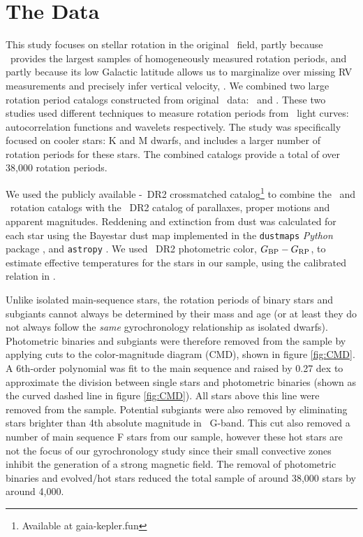 \section{The Data}
\label{sec:data}

This study focuses on stellar rotation in the original \kepler\ field, partly
because \kepler\ provides the largest samples of homogeneously measured
rotation periods, and partly because its low Galactic latitude allows us to
marginalize over missing RV measurements and precisely infer vertical
velocity, \vz.
We combined two large rotation period catalogs constructed from original
\kepler\ data: \mct\ and \sant.
These two studies used different techniques to measure rotation periods from
\kepler\ light curves: autocorrelation functions and wavelets respectively.
The \citet{santos2019} study was specifically focused on cooler stars: K and M
dwarfs, and includes a larger number of rotation periods for these stars.
The combined catalogs provide a total of over 38,000 rotation periods.

We used the publicly available \kepler-\gaia\ DR2 crossmatched
catalog\footnote{Available at gaia-kepler.fun} to combine the \mct\ and \sant\
rotation catalogs with the \gaia\ DR2 catalog of parallaxes, proper motions
and apparent magnitudes.
Reddening and extinction from dust was calculated for each star using the
Bayestar dust map implemented in the {\tt dustmaps} {\it Python} package
\citep{green2018}, and {\tt astropy} \citep{astropy2013, astropy2018}.
We used \gaia\ DR2 photometric color, $G_{\rm BP} - G_{\rm RP}$, to estimate
effective temperatures for the stars in our sample, using the calibrated
relation in \citet{curtis2020}.

Unlike isolated main-sequence stars, the rotation periods of binary stars and
subgiants cannot always be determined by their mass and age (or at least they
do not always follow the {\it same} gyrochronology relationship as isolated
dwarfs).
Photometric binaries and subgiants were therefore removed from the sample by
applying cuts to the color-magnitude diagram (CMD), shown in figure
\ref{fig:CMD}.
A 6th-order polynomial was fit to the main sequence and raised by 0.27 dex to
approximate the division between single stars and photometric binaries (shown
as the curved dashed line in figure \ref{fig:CMD}).
All stars above this line were removed from the sample.
Potential subgiants were also removed by eliminating stars brighter than 4th
absolute magnitude in \gaia\ G-band.
This cut also removed a number of main sequence F stars from our sample,
however these hot stars are not the focus of our gyrochronology study since
their small convective zones inhibit the generation of a strong magnetic
field.
The removal of photometric binaries and evolved/hot stars reduced the total
sample of around 38,000 stars by around 4,000.

